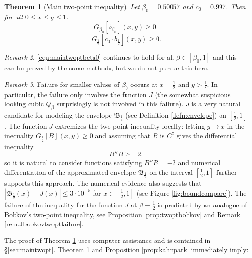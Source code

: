 \documentclass[12pt]{amsart}
\theoremstyle{plain}
\newtheorem{thm}{Theorem}[section]
\theoremstyle{definition}
\theoremstyle{remark}
\newtheorem{rem}[thm]{Remark}
\numberwithin{equation}{section}
\begin{document}
\begin{thm}[Main two-point inequality]\label{thm:maintwopt}
Let $\beta_0=0.50057$ and $c_0=0.997$.
Then for all $0\le x\le y\le 1$:
\begin{equation}\label{eqn:maintwoptbeta0}
G_{\beta_0}[b_{\beta_0}](x,y)\ge 0,
\end{equation}
\begin{equation}\label{eqn:maintwoptonehalf}
G_{\frac12}[c_0 \cdot b_{\frac12}](x,y)\ge 0.
\end{equation}
\end{thm}
\begin{rem}
\eqref{eqn:maintwoptbeta0} continues to hold for all $\beta\in [\beta_0, 1]$ and this can be proved by the same methods, but we do not pursue this here.
\end{rem}
\begin{rem}\label{rem:beta0explanation}
Failure for smaller values of $\beta_0$ occurs at $x=\tfrac12$ and $y>\tfrac12$. 
In particular, the failure only involves the function $J$ (the somewhat suspicious looking cubic $Q_\beta$ surprisingly is not involved in this failure).
$J$ is a very natural candidate for modeling the envelope $\mathfrak{B}_{\frac12}$ (see Definition \ref{defn:envelope}) on $[\frac12,1]$. 
The function $J$ extremizes the two-point inequality locally: letting $y\to x$ in the inequality $G_{\frac12}[B](x,y)\ge 0$ and assuming that $B$ is $C^2$ gives the differential inequality
\[ B'' B \ge -2, \]
so it is natural to consider functions satisfying $B''B=-2$ and numerical differentiation of the approximated envelope $\mathfrak{B}_{\frac12}$  on the interval $[\frac12,1]$ further supports this approach.
The numerical evidence also suggests that $|\mathfrak{B}_{\frac12}(x)-J(x)|\le 3\cdot 10^{-5}$ for $x\in [\frac12,1]$ (see Figure \ref{fig:boundcompare}).
The failure of the inequality for the function $J$ at $\beta=\frac12$ is predicted by an analogue of Bobkov's two-point inequality, see Proposition \ref{prop:twoptbobkov} and Remark \ref{rem:Jbobkovtwoptfailure}. 
\end{rem}

The proof of Theorem \ref{thm:maintwopt} uses computer assistance and is contained in \S \ref{sec:maintwopt}. Theorem \ref{thm:maintwopt} and Proposition \ref{prop:kahnpark} immediately imply:
\end{document}
